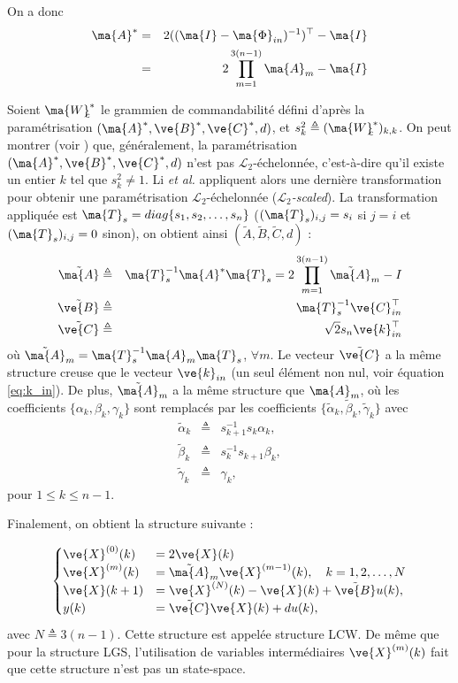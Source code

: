 On a donc 
\begin{eqnarray*}
	\ma{A}^* &=& 2((\ma{I}-\ma{\Phi}_{in})^{-1})^{\top}-\ma{I}\\
	  & = & 2\prod_{m=1}^{3(n-1)}\ma{A}_m-\ma{I}
\end{eqnarray*}

Soient $\ma{W}_{\hspace{-0.12cm}c}^*$ le grammien de commandabilité défini d'après la paramétrisation $(\ma{A}^*,\ve{B}^*,\ve{C}^*,d)$, et $s_k^2\triangleq (\ma{W}_{\hspace{-0.12cm}c}^*)_{k,k}$. On peut montrer (voir \cite{LCW07}) que, généralement, la paramétrisation $(\ma{A}^*,\ve{B}^*,\ve{C}^*,d)$ n'est pas $\mathcal{L}_2$-échelonnée, c'est-à-dire qu'il existe un entier $k$ tel que $s_k^2\neq 1$. Li \emph{et al.} appliquent alors une dernière transformation pour obtenir une paramétrisation $\mathcal{L}_2$-échelonnée ($\mathcal{L}_2$\emph{-scaled}). La transformation appliquée est $\ma{T}_s=diag\{s_1,s_2,\ldots, s_n\}$ ($(\ma{T}_s)_{i,j} = s_i$ si $j=i$ et $(\ma{T}_s)_{i,j} = 0$ sinon), on obtient ainsi $(\tilde{A},\tilde{B},\tilde{C},d)$ :
\begin{eqnarray*}
	\tilde{\ma{A}} &\triangleq& \ma{T}_s^{-1}\ma{A}^*\ma{T}_s = 2\prod_{m=1}^{3(n-1)}\tilde{\ma{A}}_m-I\\
	\tilde{\ve{B}} &\triangleq& \ma{T}_s^{-1}\ve{C}_{in}^{\top}\\
	\tilde{\ve{C}} &\triangleq& \sqrt{2}s_n\ve{k}_{in}^{\top}
\end{eqnarray*}
où $\tilde{\ma{A}}_m = \ma{T}_s^{-1}\ma{A}_m\ma{T}_s$, $\forall m$. Le vecteur $\tilde{\ve{C}}$ a la même structure creuse que le vecteur $\ve{k}_{in}$ (un seul élément non nul, voir équation \eqref{eq:k_in}). De plus, $\tilde{\ma{A}}_m$ a la même structure que $\ma{A}_m$, où les coefficients $\{\alpha_k,\beta_k,\gamma_k\}$ sont remplacés par les coefficients $\{\tilde{\alpha}_k,\tilde{\beta}_k,\tilde{\gamma}_k\}$ avec 
\begin{eqnarray*}
	\tilde{\alpha}_k &\triangleq& s_{k+1}^{-1}s_k\alpha_k,\\
	\tilde{\beta}_{k}&\triangleq& s_k^{-1}s_{k+1}\beta_k,\\
	\tilde{\gamma}_k &\triangleq& \gamma_k,
\end{eqnarray*}
pour $1\leq k \leq n-1$.

Finalement, on obtient la structure suivante :

\begin{equation*}
	\begin{cases}
		\ve{X}^{(0)}(k)&=2\ve{X}(k)\\
		\ve{X}^{(m)}(k) & =  \tilde{\ma{A}}_m\ve{X}^{(m-1)}(k), \quad k=1,2,\ldots,N\\
		\ve{X}(k+1) & =  \ve{X}^{(N)}(k)-\ve{X}(k)+\tilde{\ve{B}}u(k) ,\\
		y(k)& =  \tilde{\ve{C}}\ve{X}(k)+du(k),
	\end{cases}
\end{equation*}
avec $N\triangleq 3(n-1)$. Cette structure est appelée structure LCW. De même que pour la structure LGS, l'utilisation de variables intermédiaires $\ve{X}^{(m)}(k)$ fait que cette structure n'est pas un state-space.

